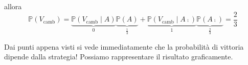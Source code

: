 \begin{enumerate}
allora\begin{equation*}
\mathbb{P}( V_{\text{camb}}) =\underbrace{\mathbb{P}( V_{\text{camb}} \mid A)}_{0}\underbrace{\mathbb{P}( A)}_{\frac{1}{3}} +\underbrace{\mathbb{P}\left( V_{\text{camb}} \mid A\comp\right)}_{1}\underbrace{\mathbb{P}\left( A\comp\right)}_{\frac{2}{3}} =\frac{2}{3}
\end{equation*}
\end{enumerate}

Dai punti appena visti si vede immediatamente che la probabilità di vittoria dipende dalla strategia! Possiamo rappresentare il risultato graficamente.



\begin{tikzpicture}[x=0.75pt,y=0.75pt,yscale=-1,xscale=1]



\end{tikzpicture}
